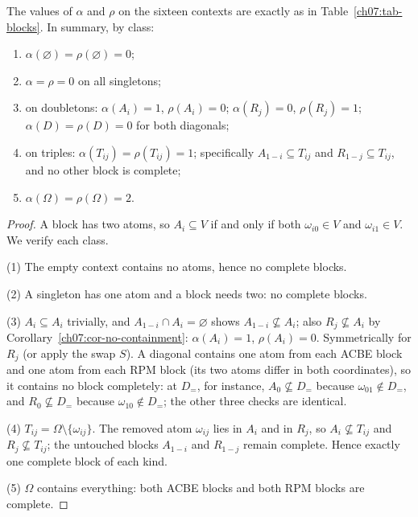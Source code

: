 \begin{theorem}\label{ch07:thm-blocks}
The values of $\alpha$ and $\rho$ on the sixteen contexts are exactly as in Table~\ref{ch07:tab-blocks}. In summary, by class:
\begin{enumerate}
\item $\alpha(\varnothing)=\rho(\varnothing)=0$;
\item $\alpha=\rho=0$ on all singletons;
\item on doubletons: $\alpha(A_{i})=1$, $\rho(A_{i})=0$; $\alpha(R_{j})=0$, $\rho(R_{j})=1$; $\alpha(D)=\rho(D)=0$ for both diagonals;
\item on triples: $\alpha(T_{ij})=\rho(T_{ij})=1$; specifically $A_{1-i}\subseteq T_{ij}$ and $R_{1-j}\subseteq T_{ij}$, and no other block is complete;
\item $\alpha(\Omega)=\rho(\Omega)=2$.
\end{enumerate}
\end{theorem}

\begin{proof}
A block has two atoms, so $A_{i}\subseteq V$ if and only if both $\omega_{i0}\in V$ and $\omega_{i1}\in V$. We verify each class.

(1) The empty context contains no atoms, hence no complete blocks.

(2) A singleton has one atom and a block needs two: no complete blocks.

(3) $A_{i}\subseteq A_{i}$ trivially, and $A_{1-i}\cap A_{i}=\varnothing$ shows $A_{1-i}\not\subseteq A_{i}$; also $R_{j}\not\subseteq A_{i}$ by Corollary~\ref{ch07:cor-no-containment}: $\alpha(A_{i})=1$, $\rho(A_{i})=0$. Symmetrically for $R_{j}$ (or apply the swap $S$). A diagonal contains one atom from each ACBE block and one atom from each RPM block (its two atoms differ in both coordinates), so it contains no block completely: at $D_{=}$, for instance, $A_{0}\not\subseteq D_{=}$ because $\omega_{01}\notin D_{=}$, and $R_{0}\not\subseteq D_{=}$ because $\omega_{10}\notin D_{=}$; the other three checks are identical.

(4) $T_{ij}=\Omega\setminus\{\omega_{ij}\}$. The removed atom $\omega_{ij}$ lies in $A_{i}$ and in $R_{j}$, so $A_{i}\not\subseteq T_{ij}$ and $R_{j}\not\subseteq T_{ij}$; the untouched blocks $A_{1-i}$ and $R_{1-j}$ remain complete. Hence exactly one complete block of each kind.

(5) $\Omega$ contains everything: both ACBE blocks and both RPM blocks are complete.
\end{proof}

